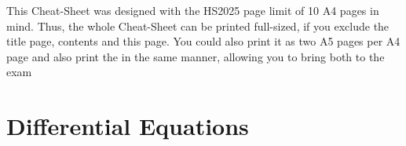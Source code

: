 \documentclass{article}
\begin{document}
This Cheat-Sheet was designed with the HS2025 page limit of 10 A4 pages in mind. 
Thus, the whole Cheat-Sheet can be printed full-sized, if you exclude the title page, contents and this page.
You could also print it as two A5 pages per A4 page and also print the 
\color{MidnightBlue}\color{black} 
\smallhspace in the same manner, allowing you to bring both to the exam



\newsection
\section{Differential Equations}


\end{document}
